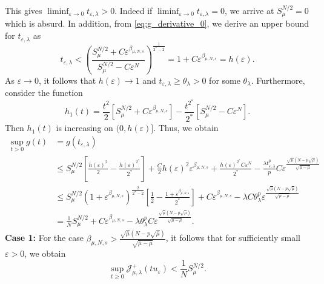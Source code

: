 \documentclass[11pt]{article}
\newcommand{\la} {\lambda}
\newcommand{\Jplus}{\mathcal{J}_{\mu,\lambda}^{+}} %
\begin{document}
This gives $\displaystyle\liminf_{\varepsilon \to 0} t_{\varepsilon,\la} > 0$. Indeed if $\displaystyle\liminf_{\varepsilon \to 0} t_{\varepsilon,\la} =0$, we arrive at $S_{\mu}^{N/2} = 0$ which is absurd. In addition, from \eqref{eq:g_derivative_0}, we derive an upper bound for \( t_{\varepsilon, \lambda} \) as
\begin{equation*}
t_{\varepsilon, \lambda} < \left( \frac{S_{\mu}^{N/2} + C \varepsilon^{\beta_{\mu,N,s}}}{S_{\mu}^{N/2} - C \varepsilon^{ N}} \right)^{\frac{1}{2^*-2}} = 1 + C \varepsilon^{\beta_{\mu,N,s}}= h(\varepsilon).
\end{equation*}
As \( \varepsilon \to 0 \), it follows that \( h(\varepsilon) \to 1 \) and $t_{\varepsilon, \lambda} \geq \theta_{\la} > 0$ for some $\theta_\la$. Furthermore, consider the function
\begin{equation*}
h_1(t) = \frac{t^2}{2} \left[ S_{\mu}^{N/2} + C \varepsilon^{\beta_{\mu,N,s}} \right] - \frac{t^{2^*}}{2^*} \left[ S_{\mu}^{N/2} - C \varepsilon^{ N} \right].
\end{equation*}
Then $h_1(t)$ is increasing on \( (0, h(\varepsilon)] \). Thus, we obtain
\begin{align*}
\sup_{t>0} g(t) & = g(t_{\varepsilon,\la})  \\
& \leq   S_{\mu}^{N/2} \left[ \frac{h(\varepsilon)^2}{2} - \frac{h(\varepsilon)^{2^*}}{2^*} \right] + \frac{C}{2} h(\varepsilon)^2 \varepsilon^{\beta_{\mu,N,s}} + \frac{h(\varepsilon)^{2^*} C \varepsilon^{ N}}{2^*}  -\frac{\la t_{\varepsilon,\la}^{p}}{p} C \varepsilon^{\frac{ \sqrt{\bar{\mu}} {(N - p\sqrt{\bar{\mu}})}}{{\sqrt{\bar{\mu} - \mu}}}}\\
& \leq   S_{\mu}^{N/2} \left(1 + \varepsilon^{\beta_{\mu,N,s}} \right)^{\frac{2}{2^*-2}} \left[ \frac{1}{2} - \frac{1 + \varepsilon^{\beta_{\mu,N,s}}}{2^*} \right] + C \varepsilon^{\beta_{\mu,N,s}}  -\la C \theta_{\la}^p \varepsilon^{\frac{ \sqrt{\bar{\mu}} {(N - p\sqrt{\bar{\mu}})}}{{\sqrt{\bar{\mu} - \mu}}}}\\
& = \frac{1}{N} S_{\mu}^{N/2} +  C \varepsilon^{\beta_{\mu,N,s}}  -\la \theta_{\la}^p C \varepsilon^{\frac{ \sqrt{\bar{\mu}} {(N - p\sqrt{\bar{\mu}})}}{{\sqrt{\bar{\mu} - \mu}}}}.
\end{align*}
\textbf{Case 1:} For the case $\beta_{\mu,N,s} > \frac{ \sqrt{\bar{\mu}} {(N - p\sqrt{\bar{\mu}})}}{{\sqrt{\bar{\mu} - \mu}}}$, it follows that for sufficiently small \( \varepsilon > 0 \), we obtain
\begin{equation*}
\sup_{t \geq 0} \Jplus(t u_{\varepsilon}) < \frac{1}{N} S_{\mu}^{N/2}.
\end{equation*}
\end{document}
